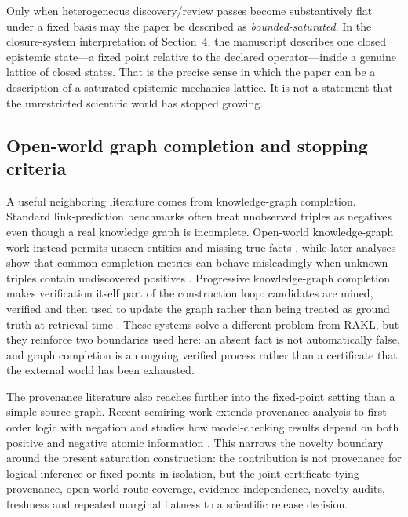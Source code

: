 \documentclass[11pt]{article}
\begin{document}
Only when heterogeneous discovery/review passes become substantively flat under a fixed basis may the paper be described as \emph{bounded-saturated}. In the closure-system interpretation of Section~4, the manuscript describes one closed epistemic state---a fixed point relative to the declared operator---inside a genuine lattice of closed states. That is the precise sense in which the paper can be a description of a saturated epistemic-mechanics lattice. It is not a statement that the unrestricted scientific world has stopped growing.

\subsection{Open-world graph completion and stopping criteria}

A useful neighboring literature comes from knowledge-graph completion. Standard link-prediction benchmarks often treat unobserved triples as negatives even though a real knowledge graph is incomplete. Open-world knowledge-graph work instead permits unseen entities and missing true facts \cite{shi2017}, while later analyses show that common completion metrics can behave misleadingly when unknown triples contain undiscovered positives \cite{yang2022}. Progressive knowledge-graph completion makes verification itself part of the construction loop: candidates are mined, verified and then used to update the graph rather than being treated as ground truth at retrieval time \cite{li2024kg}. These systems solve a different problem from RAKL, but they reinforce two boundaries used here: an absent fact is not automatically false, and graph completion is an ongoing verified process rather than a certificate that the external world has been exhausted.

The provenance literature also reaches further into the fixed-point setting than a simple source graph. Recent semiring work extends provenance analysis to first-order logic with negation and studies how model-checking results depend on both positive and negative atomic information \cite{gradel2024}. This narrows the novelty boundary around the present saturation construction: the contribution is not provenance for logical inference or fixed points in isolation, but the joint certificate tying provenance, open-world route coverage, evidence independence, novelty audits, freshness and repeated marginal flatness to a scientific release decision.
\end{document}
